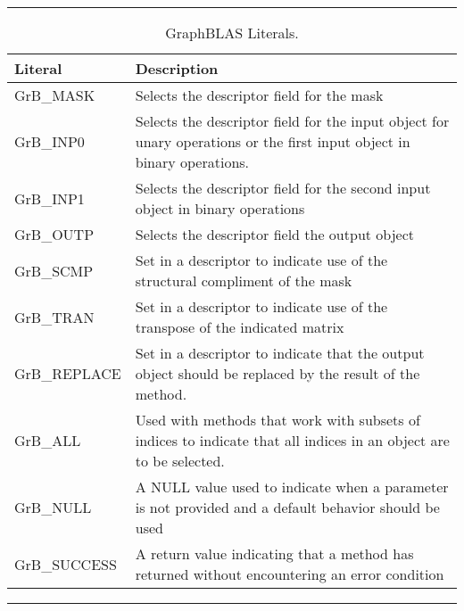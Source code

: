 \begin{table}[h]
\hrule
\begin{center}
\caption{GraphBLAS Literals.}
\label{Tab:GrBliterals}
\begin{tabular}{ll}
Literal                 & Description  \\
\hline
GrB\_MASK         & Selects the descriptor field for the mask \\
GrB\_INP0           & Selects the descriptor field for the input object for unary operations or the first input object in binary operations. \\
GrB\_INP1           & Selects the descriptor field for the second input object in binary operations \\
GrB\_OUTP         & Selects the descriptor field the output object \\
GrB\_SCMP         &  Set in a descriptor to indicate use of the structural compliment of the mask \\
GrB\_TRAN          & Set in a descriptor to indicate use of the transpose of the indicated matrix \\
GrB\_REPLACE   &  Set in a descriptor to indicate that the output object should be replaced by the result of the method. \\
GrB\_ALL              & Used with methods that work with subsets of indices to indicate that all indices in an object are to be selected. \\
GrB\_NULL            & A NULL value used to indicate when a parameter is not provided and a default behavior should be used \\
GrB\_SUCCESS    & A return value indicating that a method has returned without encountering an error condition \\
\end{tabular}
\end{center}
\hrule
\end{table}


